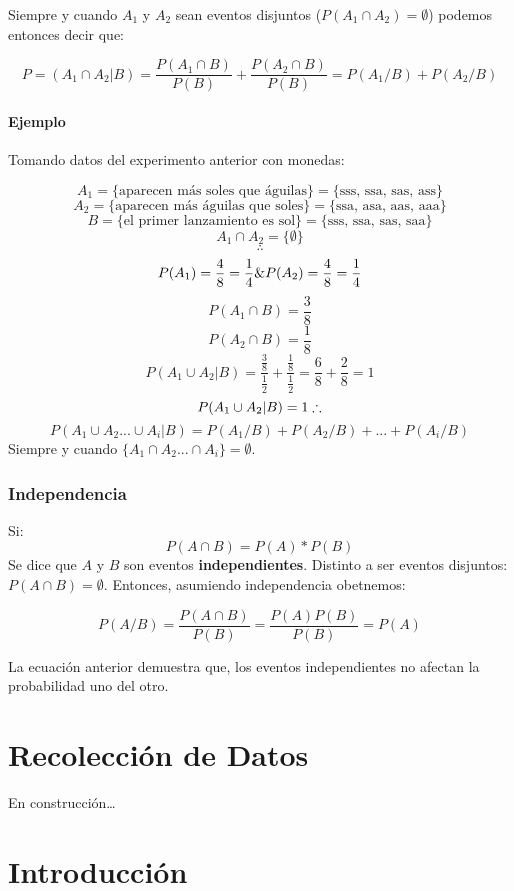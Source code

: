\documentclass[]{book}
\begin{document}
Siempre y cuando \(A_1\) y \(A_2\) sean eventos disjuntos
(\(P(A_1\cap A_2) = \emptyset\)) podemos entonces decir que:

\[P = (A_1 \cap A_2 \vert B) = \frac {P(A_1 \cap B)}{P(B)}+ \frac {P(A_2 \cap B)}{P(B)} = P(A_1/B) + P(A_2/B)\]

\subsubsection{Ejemplo}\label{ejemplo-3}

Tomando datos del experimento anterior con monedas:

\[A_1 = \{\text{aparecen más soles que águilas}\} = \{\text{sss, ssa, sas, ass}\}\]
\[A_2 = \{\text{aparecen más águilas que soles}\} = \{\text{ssa, asa, aas, aaa}\}\]
\[B = \{\text{el primer lanzamiento es sol}\} = \{\text{sss, ssa, sas, saa}\}\]
\[A_1 \cap A_2 = \{\emptyset\}\] \[\therefore\]
\[P(A_1) = \frac {4}{8} = \frac {1}{4}\space \& \space P(A_2) = \frac {4}{8} = \frac {1}{4}\]
\[P(A_1\cap B) = \frac{3}{8}\] \[P(A_2\cap B) = \frac{1}{8}\]
\[P(A_1\cup A_2\vert B) = \frac {\frac{3}{8}}{\frac{1}{2}} + \frac{\frac{1}{8}}{\frac{1}{2}} = \frac{6}{8} + \frac{2}{8} = 1\]
\[P(A_1\cup A_2\vert B) = 1 \space \therefore\]
\[P(A_1\cup A_2...\cup A_i \vert B) = P(A_1/B) + P(A_2/B)+...+ P(A_i/B)\]
Siempre y cuando \(\{A_1\cap A_2...\cap A_i\}= \emptyset\).

\subsection{Independencia}\label{independencia-1}

Si: \[P(A\cap B) = P(A)*P(B)\] Se dice que \(A\) y \(B\) son eventos
\textbf{independientes}. Distinto a ser eventos disjuntos:
\(P(A\cap B) = \emptyset\). Entonces, asumiendo independencia obetnemos:

\[P(A/B) = \frac {P(A\cap B)}{P(B)} = \frac{P(A)P(B)}{P(B)} = P(A)\]

La ecuación anterior demuestra que, los eventos independientes no
afectan la probabilidad uno del otro.

\chapter{Recolección de Datos}\label{recoleccion-de-datos}

En construcción\ldots{}

\chapter{Introducción}\label{introduccion-1}
\end{document}
